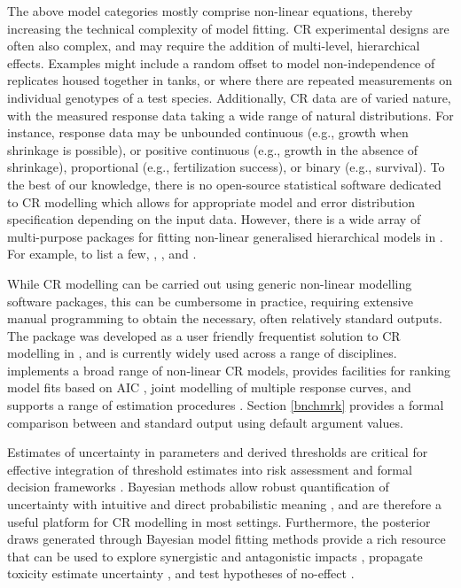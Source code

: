 \documentclass[
  shortnames]{jss}
\begin{document}
The above model categories mostly comprise non-linear equations, thereby increasing the technical complexity of model fitting. CR experimental designs are often also complex, and may require the addition of multi-level, hierarchical effects. Examples might include a random offset to model non-independence of replicates housed together in tanks, or where there are repeated measurements on individual genotypes of a test species. Additionally, CR data are of varied nature, with the measured response data taking a wide range of natural distributions. For instance, response data may be unbounded continuous (e.g., growth when shrinkage is possible), or positive continuous (e.g., growth in the absence of shrinkage), proportional (e.g., fertilization success), or binary (e.g., survival). To the best of our knowledge, there is no open-source statistical software dedicated to CR modelling which allows for appropriate model and error distribution specification depending on the input data. However, there is a wide array of multi-purpose packages for fitting non-linear generalised hierarchical models in . For example, to list a few,  \citep{pinheiro2021},  \citep{pinheiro2021},  \citep{Su2015} and  \citep{rstan2021}.

While CR modelling can be carried out using generic non-linear modelling software packages, this can be cumbersome in practice, requiring extensive manual programming to obtain the necessary, often relatively standard outputs. The  package \citep{Ritz2016} was developed as a user friendly frequentist solution to CR modelling in , and is currently widely used across a range of disciplines.  implements a broad range of non-linear CR models, provides facilities for ranking model fits based on AIC \citep{Burnham2002}, joint modelling of multiple response curves, and supports a range of estimation procedures \citep{Ritz2016}. Section \ref{bnchmrk} provides a formal comparison between  and  standard output using default argument values.

Estimates of uncertainty in parameters and derived thresholds are critical for effective integration of threshold estimates into risk assessment and formal decision frameworks \citep{fisher2018c}. Bayesian methods allow robust quantification of uncertainty with intuitive and direct probabilistic meaning \citep{Ellison1996}, and are therefore a useful platform for CR modelling in most settings. Furthermore, the posterior draws generated through Bayesian model fitting methods provide a rich resource that can be used to explore synergistic and antagonistic impacts \citep{Fisher2019d, flores2021}, propagate toxicity estimate uncertainty \citep{Charles2020a, Gottschalk2013}, and test hypotheses of no-effect \citep{Thomas2006}.
\end{document}
